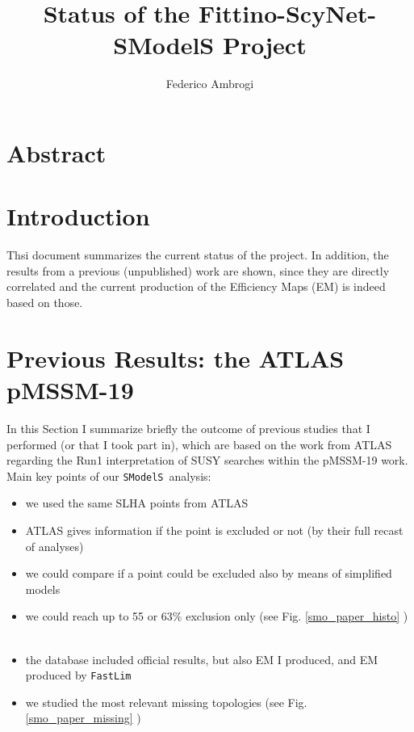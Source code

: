 \documentclass[a4paper,11pt]{article}
\begin{document}
\title{\boldmath Status of the Fittino-ScyNet-SModelS Project}

\author[a]{Federico Ambrogi}

\maketitle




\newcommand{\MG}{\texttt{MadGraph5\_aMC@NLO}}

\newcommand{\jmet}{ $3jet+E_T^{miss}$ }

\newcommand{\SMO}{ \texttt{SModelS}}
\newcommand{\FastLim}{ \texttt{FastLim}}


\section*{Abstract}


\section{Introduction}

Thsi document summarizes the current status of the project. In addition, the results from a previous (unpublished) work are shown, since they are directly correlated and the current production of the Efficiency Maps (EM) is indeed based on those. 







\section{Previous Results: the ATLAS pMSSM-19 }
In this Section I summarize briefly the outcome of previous studies that I performed (or that I took part in), which are based on the work from ATLAS \cite{} regarding the Run1 interpretation of SUSY searches within the pMSSM-19 work. Main key points of our \SMO~analysis:
\begin{itemize}
	\item we used the same SLHA points from ATLAS \
	\item ATLAS gives information if the point is excluded or not (by their full recast of analyses) \
	\item we could compare if a point could be excluded also by means of simplified models \
	\item we could reach up to 55 or 63$\%$ exclusion only (see Fig. \ref{smo_paper_histo} ) \
	\item the database included official results, but also EM I produced, and EM produced by \FastLim~ \
	\item we studied the most relevant missing topologies (see Fig. \ref{smo_paper_missing} ) 
\end{itemize}
\end{document}

